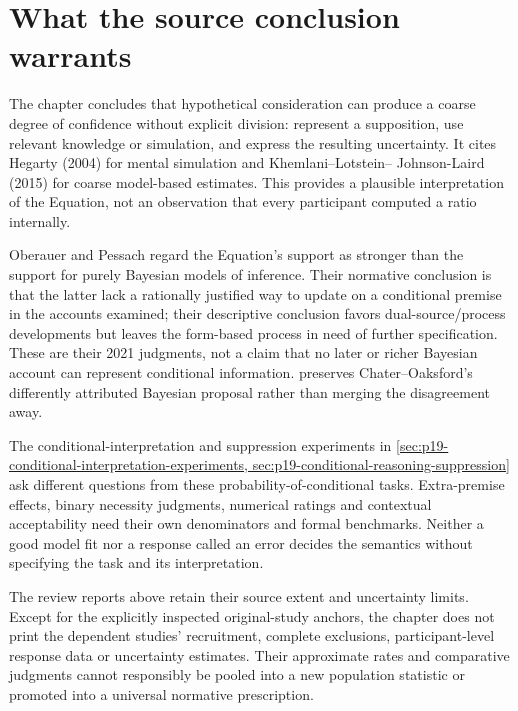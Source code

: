 \section{What the source conclusion warrants}
\label{sec:p19-rat46-boundaries}

The chapter concludes that hypothetical consideration can produce a coarse
degree of confidence without explicit division: represent a supposition,
use relevant knowledge or simulation, and express the resulting uncertainty.
It cites Hegarty (2004) for mental simulation and Khemlani--Lotstein--
Johnson-Laird (2015) for coarse model-based estimates. This provides a
plausible interpretation of the Equation, not an observation that every
participant computed a ratio internally.

Oberauer and Pessach regard the Equation's support as stronger than the
support for purely Bayesian models of inference. Their normative conclusion
is that the latter lack a rationally justified way to update on a conditional
premise in the accounts examined; their descriptive conclusion favors
dual-source/process developments but leaves the form-based process in need
of further specification. These are their 2021 judgments, not a claim that
no later or richer Bayesian account can represent conditional information.
 preserves Chater--Oaksford's differently
attributed Bayesian proposal rather than merging the disagreement away.

The conditional-interpretation and suppression experiments in
\cref{sec:p19-conditional-interpretation-experiments,
sec:p19-conditional-reasoning-suppression} ask different questions from
these probability-of-conditional tasks. Extra-premise effects, binary
necessity judgments, numerical ratings and contextual acceptability need
their own denominators and formal benchmarks. Neither a good model fit
nor a response called an error decides the semantics without specifying
the task and its interpretation.

The review reports above retain their source extent and uncertainty limits.
Except for the explicitly inspected original-study anchors, the chapter
does not print the dependent studies' recruitment, complete exclusions,
participant-level response data or uncertainty estimates. Their approximate
rates and comparative judgments cannot responsibly be pooled into a new
population statistic or promoted into a universal normative prescription.
